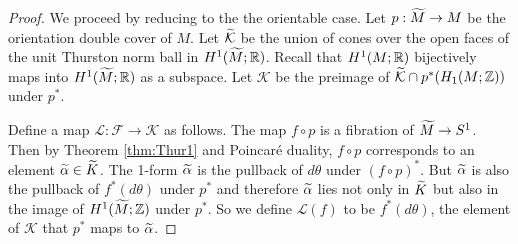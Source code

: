 \begin{proof}
  We proceed by reducing to the the orientable case. Let $p:\widetilde{M}\rightarrow M$ be the orientation double cover of $M$.  %
 Let $\widetilde{\mathcal{K}}$ be the union of cones over the open faces of the unit Thurston norm ball in $H^1(\widetilde{M};\mathbb{R})$. Recall that $H^1(M; \mathbb{R})$ bijectively maps into
  $H^1(\widetilde{M}; \mathbb{R})$ as a subspace. Let $\mathcal{K}$ be the preimage of $\mathcal{\widetilde{K}}\cap p^\ast(H_1(M;\mathbb{Z}))$ under $p^\ast$.  %

 Define a map $\mathcal{L}:\mathcal{F}\rightarrow \mathcal{K}$ as follows.  %
 The map $f\circ p$ is a fibration of $\widetilde{M}\to S^1$.  Then by Theorem \ref{thm:Thur1} and Poincar\'e duality, $f\circ p$ corresponds to an element $\widetilde{\alpha}\in \widetilde{K}$.  The 1-form $\widetilde{\alpha}$ is the pullback of $d\theta$ under $(f\circ p)^\ast$.  But $\widetilde{\alpha}$ is also the pullback of $f^\ast(d\theta)$ under $p^\ast$ and therefore $\widetilde{\alpha}$ lies not only in $\widetilde{K}$ but also in the image of $H^1(\widetilde{M};\mathbb{Z})$ under $p^\ast$.  So we define $\mathcal{L}(f)$ to be $f^\ast(d\theta)$, the element of $\mathcal{K}$ that $p^\ast$ maps to $\widetilde{\alpha}$.


\end{proof}
